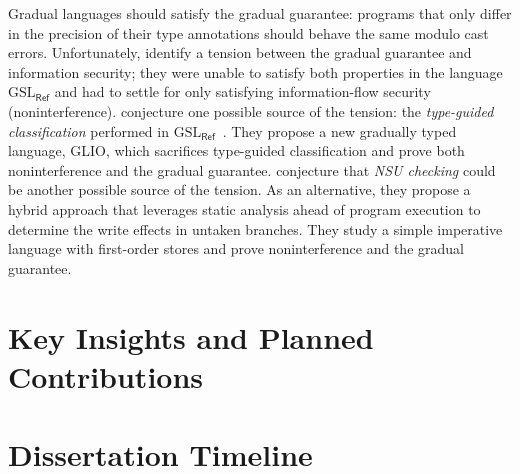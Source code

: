 \documentclass[10pt, letterpaper]{article}
\newcommand{\GSLRef}{\ensuremath{\mathrm{GSL}_\mathsf{Ref}}\xspace}
\begin{document}
Gradual languages should satisfy the gradual guarantee: programs that only
differ in the precision of their type annotations should behave the same modulo
cast errors. Unfortunately, \citet{Toro:2018aa} identify a tension between the
gradual guarantee and information security; they were unable to satisfy both
properties in the language \GSLRef and had to settle for only satisfying
information-flow security (noninterference). \citet{Amorim:2020aa} conjecture
one possible source of the tension: the \textit{type-guided classification}
performed in \GSLRef~\citep{Toro:2018aa}. They propose a new gradually typed language,
GLIO, which sacrifices type-guided classification and prove both noninterference and
the gradual guarantee. \citet{bichhawat2021gradual} conjecture that \textit{NSU checking}
could be another possible source of the tension. As an alternative,
they propose a hybrid approach that leverages static analysis ahead of program
execution to determine the write effects in untaken branches. They study a
simple imperative language with first-order stores and prove
noninterference and the gradual guarantee.

\section{Key Insights and Planned Contributions}

\section{Dissertation Timeline}

\clearpage


\end{document}
